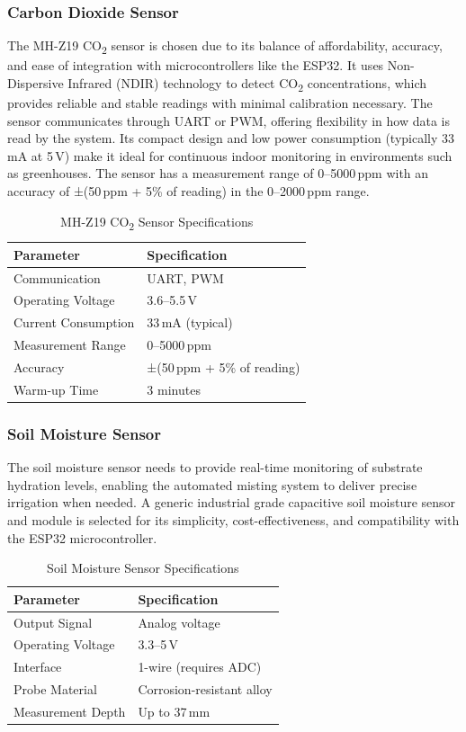 \subsubsection{ Carbon Dioxide Sensor}
The MH-Z19 CO\textsubscript{2} sensor is chosen due to its balance of affordability, accuracy, and ease of integration with microcontrollers like the ESP32. It uses Non-Dispersive Infrared (NDIR) technology to detect CO\textsubscript{2} concentrations, which provides reliable and stable readings with minimal calibration necessary. The sensor communicates through UART or PWM, offering flexibility in how data is read by the system. Its compact design and low power consumption (typically 33\,mA at 5\,V) make it ideal for continuous indoor monitoring in environments such as greenhouses. The sensor has a measurement range of 0--5000\,ppm with an accuracy of ±(50\,ppm + 5\% of reading) in the 0--2000\,ppm range.

\begin{table}[H]
	\centering
	\caption{MH-Z19 CO\textsubscript{2} Sensor Specifications}
	\label{tab:mhz19_specs}
	\begin{tabular}{ll}
		\toprule
		\textbf{Parameter} & \textbf{Specification} \\
		\midrule
		Communication & UART, PWM \\
		Operating Voltage & 3.6--5.5\,V \\
		Current Consumption & 33\,mA (typical) \\
		Measurement Range & 0--5000\,ppm \\
		Accuracy & ±(50\,ppm + 5\% of reading) \\
		Warm-up Time & 3 minutes \\
		\bottomrule
	\end{tabular}
\end{table}


\subsubsection{ Soil Moisture Sensor}
\label{subsubsec:soil_moisture}
The soil moisture sensor needs to provide real-time monitoring of substrate hydration levels, enabling the automated misting system to deliver precise irrigation when needed. A generic industrial grade capacitive soil moisture sensor and module is selected for its simplicity, cost-effectiveness, and compatibility with the ESP32 microcontroller.

\begin{table}[h]
	\centering
	\caption{Soil Moisture Sensor Specifications}
	\label{tab:sen0114_specs}
	\begin{tabular}{ll}
		\toprule
		\textbf{Parameter} & \textbf{Specification} \\
		\midrule
		Output Signal & Analog voltage \\
		Operating Voltage & 3.3--5\,V \\
		Interface & 1-wire (requires ADC) \\
		Probe Material & Corrosion-resistant alloy \\
		Measurement Depth & Up to 37\,mm \\
		\bottomrule
	\end{tabular}
\end{table}

